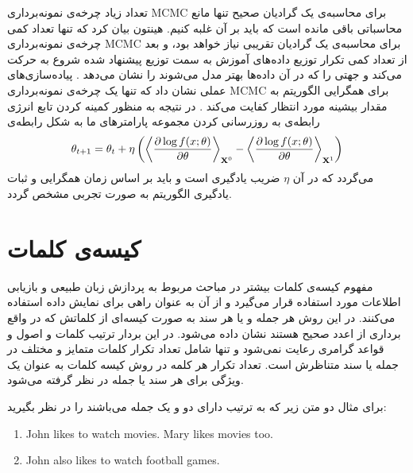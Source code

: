 تعداد زیاد چرخه‌‌ی نمونه‌برداری
MCMC
برای محاسبه‌ی یک گرادیان صحیح تنها مانع محاسباتی باقی‌ مانده است که باید بر آن غلبه کنیم. هینتون بیان کرد که تنها تعداد کمی چرخه‌ی نمونه‌برداری
MCMC
برای محاسبه‌ی یک گرادیان تقریبی نیاز خواهد بود، و بعد از تعداد کمی‌ تکرار توزیع داده‌های آموزش به سمت توزیع پیشنهاد شده شروع به حرکت می‌‌کند و جهتی‌ را که در آن داد‌ه‌ها بهتر مدل می‌شوند را نشان می‌‌دهد
\cite{hinton2002training}\cite{carreira2005contrastive}.
پیاده‌سازی‌های عملی‌ نشان داد که تنها یک چرخه‌ی نمونه‌برداری
MCMC
برای همگرایی الگوریتم به مقدار بیشینه مورد انتظار کفایت می‌‌کند
\cite{carreira2005contrastive}.
در نتیجه به منظور کمینه کردن تابع انرژی رابطه‌ی به روز‌رسانی کردن مجموعه پارامتر‌های ما به شکل رابطه‌ی
\begin{align}
	\centering
	\label{eq12}
	\theta_{t+1} = \theta_t + \eta \left(  \left\langle \dfrac{\partial \log f(x; \theta)}{\partial \theta} \right\rangle_{\textbf{X}^0} - \left\langle \dfrac{\partial \log f(x;\theta)}{\partial \theta}\right\rangle_{\textbf{X}^1}  \right) 
\end{align}
می‌گردد که در آن
$\eta$
ضریب یادگیری است و باید بر اساس زمان همگرایی و ثبات یادگیری الگوریتم به صورت تجربی‌ مشخص گردد.

\section{کیسه‌ی کلمات}
\label{chap2sec10}
مفهوم کیسه‌ی کلمات
 بیشتر در مباحث مربوط به پردازش زبان طبیعی و بازیابی اطلاعات
مورد استفاده قرار می‌‌گیرد و از آن به عنوان راهی‌ برای نمایش داده استفاده می‌‌کنند. در این روش هر جمله و یا هر سند به صورت کیسه‌ای از کلماتش که در واقع برداری از اعدد صحیح هستند نشان داده می‌‌شود. در این بردار ترتیب کلمات و اصول و قواعد گرامری رعایت نمی‌‌شود و تنها شامل تعداد تکرار کلمات متمایز و مختلف در جمله یا سند  متناظرش است. تعداد تکرار هر کلمه در روش کیسه کلمات به عنوان یک ویژگی‌ برای هر سند یا جمله در نظر گرفته می‌‌شود.

برای مثال دو متن زیر که به ترتیب دارای دو و یک جمله می‌باشند را در نظر بگیرید:


\begin{latin}
\begin{enumerate}
	\item John likes to watch movies. Mary likes movies too.
	\item John also likes to watch football games.
\end{enumerate}
\end{latin}
\vspace{-0.4cm}

